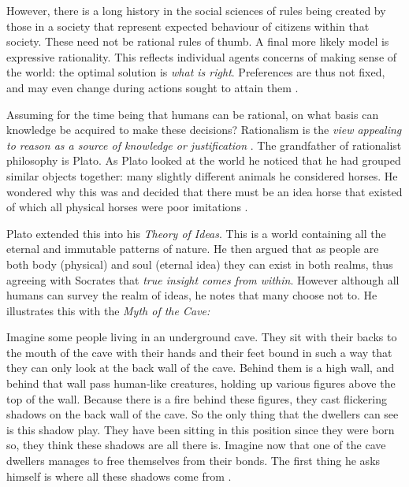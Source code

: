 However, there is a long history in the social sciences of rules being created by those in a society that represent expected behaviour of citizens within that society. These need not be rational rules of thumb. A final more likely model is expressive rationality. This reflects individual agents concerns of making sense of the world: the optimal solution is \textit{what is right}. Preferences are thus not fixed, and may even change during actions sought to attain them \citep{Hargreaves:1989}.

Assuming for the time being that humans can be rational, on what basis can knowledge be acquired to make these decisions? Rationalism is the \textit{view appealing to reason as a source of knowledge or justification} \citep{Lacey:1976}. The grandfather of rationalist philosophy is Plato. As Plato looked at the world he noticed that he had grouped similar objects together: many slightly different animals he considered horses. He wondered why this was and decided that there must be an idea horse that existed of which all physical horses were poor imitations \citep{Gardner:1995}.

Plato extended this into his \textit{Theory of Ideas}. This is a world containing all the eternal and immutable patterns of nature. He then argued that as people are both body (physical) and soul (eternal idea) they can exist in both realms, thus agreeing with Socrates that \textit{true insight comes from within}. However although all humans can survey the realm of ideas, he notes that many choose not to. He illustrates this with the \textit{Myth of the Cave:}

\begin{displayquote}
Imagine some people living in an underground cave. They sit with their backs to the mouth of the cave with their hands and their feet bound in such a way that they can only look at the back wall of the cave. Behind them is a high wall, and behind that wall pass human-like creatures, holding up various figures above the top of the wall. Because there is a fire behind these figures, they cast flickering shadows on the back wall of the cave. So the only thing that the dwellers can see is this shadow play. They have been sitting in this position since they were born so, they think these shadows are all there is. Imagine now that one of the cave dwellers manages to free themselves from their bonds. The first thing he asks himself is where all these shadows come from \citep{Plato:1901}.
\end{displayquote}

